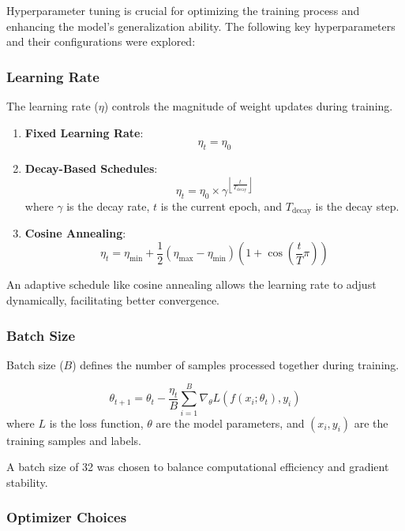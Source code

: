 \documentclass[conference]{IEEEtran}
\begin{document}
Hyperparameter tuning is crucial for optimizing the training process and enhancing the model's generalization ability. The following key hyperparameters and their configurations were explored:

\subsubsection{Learning Rate}

The learning rate (\( \eta \)) controls the magnitude of weight updates during training.

\begin{enumerate}
    \item \textbf{Fixed Learning Rate}:
    \[
    \eta_t = \eta_0
    \]

    \item \textbf{Decay-Based Schedules}:
    \[
    \eta_t = \eta_0 \times \gamma^{\left\lfloor \frac{t}{T_{\text{decay}}} \right\rfloor}
    \]
    where \( \gamma \) is the decay rate, \( t \) is the current epoch, and \( T_{\text{decay}} \) is the decay step.

    \item \textbf{Cosine Annealing}:
    \[
    \eta_t = \eta_{\text{min}} + \frac{1}{2} (\eta_{\text{max}} - \eta_{\text{min}}) \left(1 + \cos\left( \frac{t}{T} \pi \right)\right)
    \]
\end{enumerate}

An adaptive schedule like cosine annealing allows the learning rate to adjust dynamically, facilitating better convergence.

\subsubsection{Batch Size}

Batch size (\( B \)) defines the number of samples processed together during training.

\[
\theta_{t+1} = \theta_t - \frac{\eta_t}{B} \sum_{i=1}^{B} \nabla_\theta L(f(x_i; \theta_t), y_i)
\]
where \( L \) is the loss function, \( \theta \) are the model parameters, and \( (x_i, y_i) \) are the training samples and labels.

A batch size of 32 was chosen to balance computational efficiency and gradient stability.

\subsubsection{Optimizer Choices}
\end{document}
